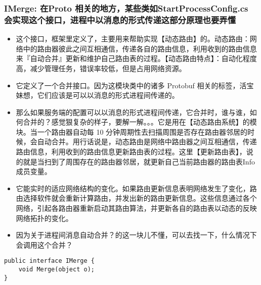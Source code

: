 \documentclass[9pt, b5paper]{article}
\begin{document}
\subsubsection{IMerge: 在Proto 相关的地方，某些类如StartProcessConfig.cs 会实现这个接口，进程中以消息的形式传递这部分原理也要弄懂}
\label{sec-6-1-4}
\begin{itemize}
\item 这个接口，框架里定义了，主要用来帮助实现【动态路由】的。动态路由：网络中的路由器彼此之间互相通信，传递各自的路由信息，利用收到的路由信息来『自动合并』更新和维护自己路由表的过程。【动态路由特点】：自动化程度高，减少管理任务，错误率较低，但是占用网络资源。
\item 它定义了一个合并接口。因为这模块类中的诸多 Protobuf 相关的标签，活宝妹想，它们应该是可以以消息的形式进程间传递的。
\item 那么如果服务端的配置可以以消息的形式进程间传递，它合并时，谁与谁，如何合并的？感觉狠复杂的样子，要解一解。。。它是用在【动态路由系统】的模块。当一个路由器自动每 10 分钟周期性去扫描周围是否存在路由器邻居的时候，会自动合并。用行话说是，动态路由是网络中路由器之间互相通信，传递路由信息，利用收到的路由信息更新路由表的过程。这里【更新路由表】，说的就是当扫到了周围存在的路由器邻居，就更新自己当前路由器的路由表Info 成员变量。
\item 它能实时的适应网络结构的变化。如果路由更新信息表明网络发生了变化，路由选择软件就会重新计算路由，并发出新的路由更新信息。这些信息通过各个网络，引起各路由器重新启动其路由算法，并更新各自的路由表以动态的反映网络拓扑的变化。
\item 因为关于进程间消息自动合并？的这一块儿不懂，可以去找一下，什么情况下会调用这个合并？
\end{itemize}
\begin{verbatim}
public interface IMerge {
    void Merge(object o);
}
\end{verbatim}
\end{document}
